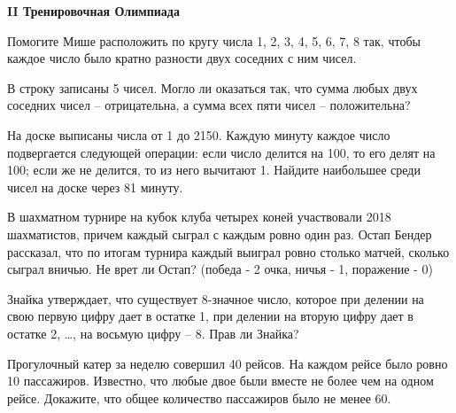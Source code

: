 \centerline{\bf \Huge II Тренировочная Олимпиада}

\begin{flushright}

\end{flushright}


 Помогите Мише расположить по кругу числа 1, 2, 3, 4, 5, 6, 7, 8 так,
чтобы каждое число было кратно разности двух соседних с ним чисел. 

 В строку записаны 5 чисел. Могло ли оказаться так, что сумма любых двух
соседних чисел – отрицательна, а сумма всех пяти чисел – положительна?

 На доске выписаны числа от 1 до 2150. Каждую минуту каждое число подвергается следующей
операции: если число делится на 100, то его делят на 100; если же не делится, то из него
вычитают 1. Найдите наибольшее среди чисел на доске через 81 минуту.


 В шахматном турнире на кубок клуба четырех коней участвовали 2018 шахматистов, причем
каждый сыграл с каждым ровно один раз. Остап Бендер рассказал, что по итогам турнира
каждый выиграл ровно столько матчей, сколько сыграл вничью. Не врет ли Остап? (победа - 2 очка, ничья - 1, поражение - 0)


 Знайка утверждает, что существует 8-значное число, которое при делении на свою первую
цифру дает в остатке 1, при делении на вторую цифру дает в остатке 2, …, на восьмую цифру –
8. Прав ли Знайка?

 Прогулочный катер за неделю совершил 40 рейсов. На каждом рейсе было
ровно 10 пассажиров. Известно, что любые двое были вместе не более чем на
одном рейсе. Докажите, что общее количество пассажиров было не менее 60.